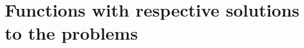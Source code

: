 \documentclass[english,bachelor]{diploma}
\begin{document}
\MakeTitlePages

\listoffigures
\clearpage







%


\printbibliography[heading=bibintoc]

\appendix
%
%


\chapter{Functions with respective solutions to the problems}

\end{document}
